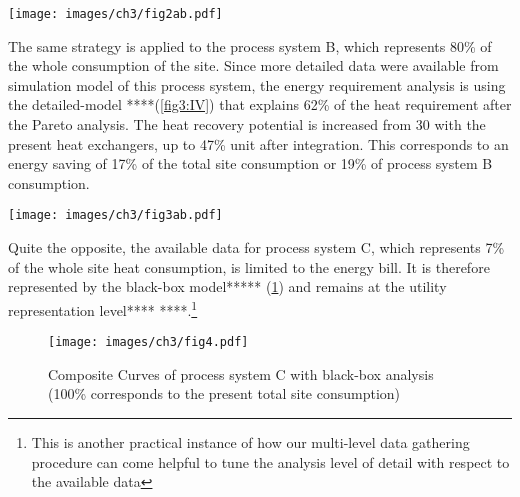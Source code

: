 \vspace{10pt}
\begin{figure*}[!ht]
\begin{center}
\texttt{[image: images/ch3/fig2ab.pdf]}
\caption{Composite Curves of process system A from black-box to simple-model analysis with SPI (100\% corresponds to the present total site consumption)}
\label{fig3:III}
\end{center}
\end{figure*}

The same strategy is applied to the process system B, which represents 80\% of the whole consumption of the site. Since more detailed data were available from simulation model of this process system, the energy requirement analysis is using the detailed-model ****(\cref{fig3:IV}) that explains 62\% of the heat requirement after the Pareto analysis. The heat recovery potential is increased from 30 with the present heat exchangers, up to 47\% unit after integration. This corresponds to an energy saving of 17\% of the total site consumption or 19\% of process system B consumption.

 
\begin{figure*}[!ht]
\begin{center}
\texttt{[image: images/ch3/fig3ab.pdf]}
\caption{Composite Curves of process system B from  black-box to detailed-model analysis with SPI (100\% corresponds to the present total site consumption)}
\label{fig3:IV}
\end{center}
\end{figure*}

Quite the opposite, the available data for process system C, which represents 7\% of the whole site heat consumption, is limited to the energy bill. It is therefore represented by the  black-box model***** (\cref{fig3:V}) and remains at the utility representation level**** ****.\footnote{This is another practical instance of how our multi-level data gathering procedure can come helpful to tune the analysis level of detail with respect to the available data} 
 
\vspace{10pt}
\begin{figure}[!ht]
\begin{center}
\texttt{[image: images/ch3/fig4.pdf]}
\caption{Composite Curves of process system C with black-box analysis (100\% corresponds to the present total site consumption)}
\label{fig3:V}
\end{center}
\end{figure}

